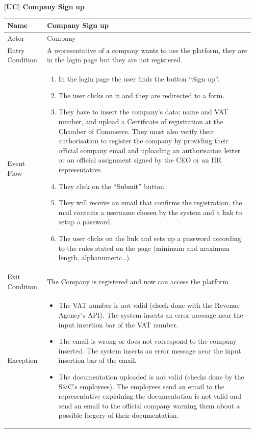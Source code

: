 \textbf{[UC\nextUseCases] Company Sign up}
\begin{table}[H] %
    \centering
    \begin{tabular}{|p{3cm}|p{10cm}|}
    \hline
    Name & Company Sign up \\ \hline
    Actor  & Company \\ \hline
    Entry Condition  & A representative of a company wants to use the platform, they are in the login page but they are not registered. \\ \hline
    Event Flow  & 
    \begin{enumerate}[noitemsep, topsep=0pt]
        \item In the login page the user finds the button “Sign up”.
        \item The user clicks on it and they are redirected to a form.
        \item They have to insert the company’s data: name and VAT number, and upload a Certificate of registration at the Chamber of Commerce. They must also verify their authorisation to register the company by providing their official company email and uploading an authorisation letter or an official assignment signed by the CEO or an HR representative.
        \item They click on the “Submit” button.
        \item They will receive an email that confirms the registration, the mail contains a username chosen by the system and a link to setup a password.
        \item The user clicks on the link and sets up a password according to the rules stated on the page (minimum and maximum length, alphanumeric…).
    \end{enumerate} \\ \hline
    Exit Condition  & The Company is registered and now can access the platform. \\ \hline
    Exception  & 
    \begin{itemize}
        \item [\text{(4)}] The VAT number is not valid (check done with the Revenue Agency’s API). The system inserts an error message near the input insertion bar of the VAT number.
        \item [\text{(4)}] The email is wrong or does not correspond to the company inserted. The system inserts an error message near the input insertion bar of the email.
        \item [\text{(5)}] The documentation uploaded is not valid (checks done by the S\&C’s employees). The employees send an email to the representative explaining the documentation is not valid and send an email to the official company warning them about a possible forgery of their documentation.

\end{itemize}
\end{tabular}
\end{table}
